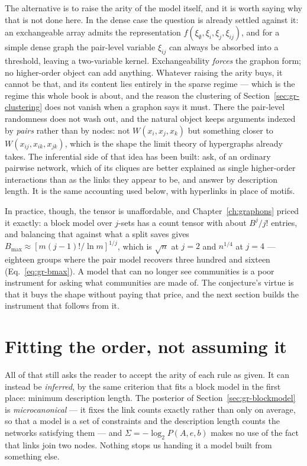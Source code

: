 \noindent The alternative is to raise the arity of the model itself, and it is
worth saying why that is not done here. In the dense case the question is already
settled against it: an exchangeable array admits the representation
$f(\xi_\emptyset,\xi_i,\xi_j,\xi_{ij})$, and for a simple dense graph the
pair-level variable $\xi_{ij}$ can always be absorbed into a threshold, leaving a
two-variable kernel. Exchangeability \emph{forces} the graphon form; no
higher-order object can add anything. Whatever raising the arity buys, it cannot
be that, and its content lies entirely in the sparse regime --- which is the
regime this whole book is about, and the reason the clustering of
Section~\ref{sec:gr-clustering} does not vanish when a graphon says it must.
There the pair-level randomness does not wash out, and the natural object keeps
arguments indexed by \emph{pairs} rather than by nodes: not $W(x_i,x_j,x_k)$ but
something closer to $W(x_{ij},x_{ik},x_{jk})$, which is the shape the limit
theory of hypergraphs already takes. The inferential side of that idea has been
built: \citet{young2021hypergraph} ask, of an ordinary pairwise network, which of
its cliques are better explained as single higher-order interactions than as the
links they appear to be, and answer by description length. It is the same
accounting used below, with hyperlinks in place of motifs.

In practice, though, the tensor is unaffordable, and Chapter~\ref{ch:graphons}
priced it exactly: a block model over $j$-sets has a count tensor with about
$B^j/j!$ entries, and balancing that against what a split saves gives
$B_{\max}\approx[m(j-1)!/\ln m]^{1/j}$, which is $\sqrt n$ at $j=2$ and $n^{1/4}$
at $j=4$ --- eighteen groups where the pair model recovers three hundred and
sixteen (Eq.~\eqref{eq:gr-bmax}). A model that can no longer see communities is a
poor instrument for asking what communities are made of. The conjecture's virtue
is that it buys the shape without paying that price, and the next section builds
the instrument that follows from it.

\section{Fitting the order, not assuming it}
\label{sec:gr-motifsbm}

All of that still asks the reader to accept the arity of each rule as given. It
can instead be \emph{inferred}, by the same criterion that fits a block model in
the first place: minimum description length. The posterior of
Section~\ref{sec:gr-blockmodel} is \emph{microcanonical} --- it fixes the link
counts exactly rather than only on average, so that a model is a set of
constraints and the description length counts the networks satisfying them --- and
$\Sigma=-\log_2P(A,e,b)$ makes no use of the fact that links join two nodes. Nothing stops us handing it a
model built from something else.

